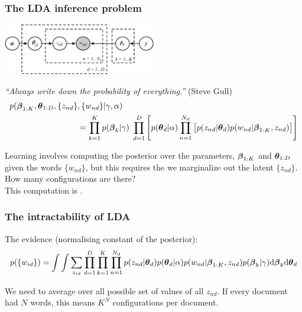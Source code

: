 \begin{frame}
\frametitle{The LDA inference problem}

\centerline{\includegraphics[width=0.5\textwidth]{lda2}}

\emph{``Always write down the probability of everything.''} (Steve Gull)
%
\begin{align*}
p(\boldsymbol{\beta}_{1:K},\boldsymbol{\theta}_{1:D},\{z_{nd}\}&,\{w_{nd}\}|\gamma, \alpha)\\
&=\prod_{k=1}^K p(\boldsymbol{\beta}_k|\gamma) \; \prod_{d=1}^D \left[ p(\boldsymbol{\theta}_d|\alpha)
\prod_{n=1}^{N_d} \big[
p(z_{nd}|\boldsymbol{\theta}_d)p(w_{nd}|\boldsymbol{\beta}_{1:K},z_{nd})\big] \right]
\end{align*}
%

Learning involves computing the posterior over the parameters, $\boldsymbol{\beta}_{1:K}$ and
$\boldsymbol{\theta}_{1:D}$ given the words $\{w_{nd}\}$, but this requires the we
marginalize out the latent $\{z_{nd}\}$.\\[1ex]

How many configurations are there?\\[1ex]

This computation is .

\end{frame}


\begin{frame}
\frametitle{The intractability of LDA}

The evidence (normalising constant of the posterior):
%
\[
p(\{w_{id}\})=
\int\int
\sum_{z_{id}}
\prod_{d=1}^D \prod_{k=1}^K
\prod_{n=1}^{N_d} 
 p(z_{nd}|\boldsymbol{\theta}_d)p(\boldsymbol{\theta}_d|\alpha)
 p(w_{nd}|\boldsymbol{\beta}_{1:K},z_{nd})p(\boldsymbol{\beta}_k|\gamma)\mathrm{d}\boldsymbol{\beta}_k\mathrm{d}\boldsymbol{\theta}_d
\]
%

We need to average over all possible set of values of all $z_{nd}$. If
every document had $N$ words, this means $K^N$ configurations per document.

\end{frame}


